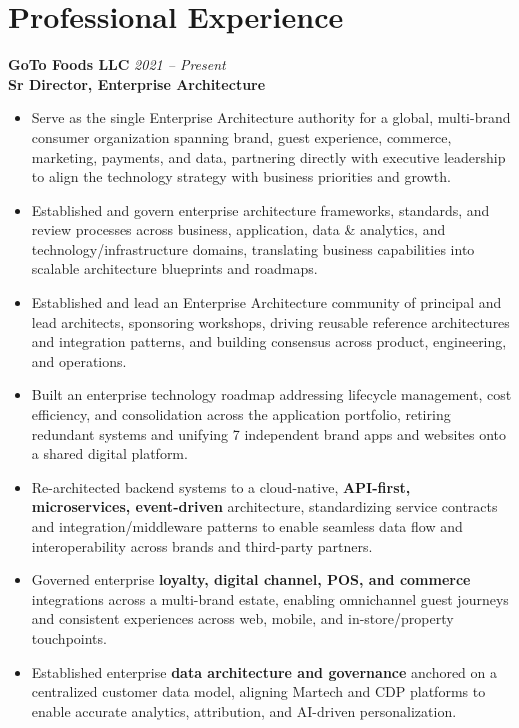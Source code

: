 \documentclass[11pt]{article}
\begin{document}
\section*{Professional Experience}

\textbf{GoTo Foods LLC} \hfill \textit{2021 -- Present} \\
\textbf{Sr Director, Enterprise Architecture}

\begin{itemize}
  \item Serve as the single Enterprise Architecture authority for a global, multi-brand consumer organization spanning brand, guest experience, commerce, marketing, payments, and data, partnering directly with executive leadership to align the technology strategy with business priorities and growth.
  \item Established and govern enterprise architecture frameworks, standards, and review processes across business, application, data \& analytics, and technology/infrastructure domains, translating business capabilities into scalable architecture blueprints and roadmaps.
  \item Established and lead an Enterprise Architecture community of principal and lead architects, sponsoring workshops, driving reusable reference architectures and integration patterns, and building consensus across product, engineering, and operations.
  \item Built an enterprise technology roadmap addressing lifecycle management, cost efficiency, and consolidation across the application portfolio, retiring redundant systems and unifying 7 independent brand apps and websites onto a shared digital platform.
  \item Re-architected backend systems to a cloud-native, \textbf{API-first, microservices, event-driven} architecture, standardizing service contracts and integration/middleware patterns to enable seamless data flow and interoperability across brands and third-party partners.
  \item Governed enterprise \textbf{loyalty, digital channel, POS, and commerce} integrations across a multi-brand estate, enabling omnichannel guest journeys and consistent experiences across web, mobile, and in-store/property touchpoints.
  \item Established enterprise \textbf{data architecture and governance} anchored on a centralized customer data model, aligning Martech and CDP platforms to enable accurate analytics, attribution, and AI-driven personalization.

\end{itemize}
\end{document}
